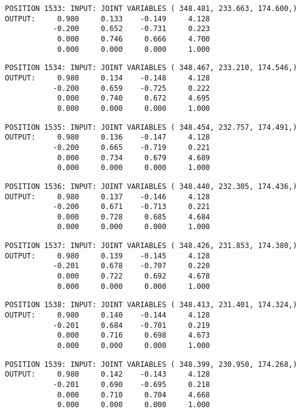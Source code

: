 \begin{verbatim}
POSITION 1533: INPUT: JOINT VARIABLES ( 348.481, 233.663, 174.600,)
OUTPUT:     0.980     0.133    -0.149     4.128
           -0.200     0.652    -0.731     0.223
            0.000     0.746     0.666     4.700
            0.000     0.000     0.000     1.000
\end{verbatim} \pagebreak[1]\begin{verbatim}
POSITION 1534: INPUT: JOINT VARIABLES ( 348.467, 233.210, 174.546,)
OUTPUT:     0.980     0.134    -0.148     4.128
           -0.200     0.659    -0.725     0.222
            0.000     0.740     0.672     4.695
            0.000     0.000     0.000     1.000
\end{verbatim} \pagebreak[1]\begin{verbatim}
POSITION 1535: INPUT: JOINT VARIABLES ( 348.454, 232.757, 174.491,)
OUTPUT:     0.980     0.136    -0.147     4.128
           -0.200     0.665    -0.719     0.221
            0.000     0.734     0.679     4.689
            0.000     0.000     0.000     1.000
\end{verbatim} \pagebreak[1]\begin{verbatim}
POSITION 1536: INPUT: JOINT VARIABLES ( 348.440, 232.305, 174.436,)
OUTPUT:     0.980     0.137    -0.146     4.128
           -0.200     0.671    -0.713     0.221
            0.000     0.728     0.685     4.684
            0.000     0.000     0.000     1.000
\end{verbatim} \pagebreak[1]\begin{verbatim}
POSITION 1537: INPUT: JOINT VARIABLES ( 348.426, 231.853, 174.380,)
OUTPUT:     0.980     0.139    -0.145     4.128
           -0.201     0.678    -0.707     0.220
            0.000     0.722     0.692     4.678
            0.000     0.000     0.000     1.000
\end{verbatim} \pagebreak[1]\begin{verbatim}
POSITION 1538: INPUT: JOINT VARIABLES ( 348.413, 231.401, 174.324,)
OUTPUT:     0.980     0.140    -0.144     4.128
           -0.201     0.684    -0.701     0.219
            0.000     0.716     0.698     4.673
            0.000     0.000     0.000     1.000
\end{verbatim} \pagebreak[1]\begin{verbatim}
POSITION 1539: INPUT: JOINT VARIABLES ( 348.399, 230.950, 174.268,)
OUTPUT:     0.980     0.142    -0.143     4.128
           -0.201     0.690    -0.695     0.218
            0.000     0.710     0.704     4.668
            0.000     0.000     0.000     1.000
\end{verbatim} \pagebreak[1]\begin{verbatim}

\end{verbatim}
